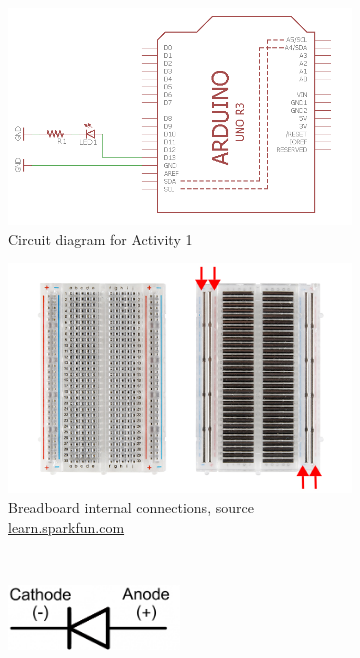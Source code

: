 \documentclass[12pt]{book}
\begin{document}
\begin{figure}[tb]
	\centering
  \begin{subfigure}[b]{0.55 \textwidth}
	\includegraphics[width=\textwidth]{schem/Experiment1}
	\caption{Circuit diagram for Activity 1}
	\label{fig:SchemEx1}
  \end{subfigure}
\hfill
  \begin{subfigure}[b]{0.4 \textwidth}
  \includegraphics[width=\textwidth]{schem/breadboard.jpg}
  \caption{Breadboard internal connections, source \url{learn.sparkfun.com}}
  \label{fig:breadboard}
  \end{subfigure}\\
\vspace*{.5em}
\begin{subfigure}{0.5\textwidth}
\centering
\includegraphics[width=0.5\textwidth]{schem/diode-schema.png}\\

\end{subfigure}
\end{figure}
\end{document}
